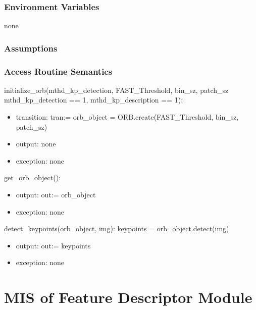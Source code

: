 \documentclass[12pt, titlepage]{article}
\begin{document}
\subsubsection{Environment Variables}
none

\subsubsection{Assumptions}


\subsubsection{Access Routine Semantics}

\noindent initialize\_orb(mthd\_kp\_detection, FAST\_Threshold, bin\_sz, patch\_sz 
\textbar \: mthd\_kp\_detection == 1, mthd\_kp\_description == 1):
\begin{itemize}
  \item transition: tran:= orb\_object = ORB.create(FAST\_Threshold, bin\_sz, patch\_sz) 
  \item output: none
  \item exception: none
\end{itemize}
\noindent get\_orb\_object():
\begin{itemize}
  \item output: out:= orb\_object
  \item exception: none
\end{itemize}
\noindent detect\_keypoints(orb\_object, img):\newline\newline
keypoints = orb\_object.detect(img)
\begin{itemize}
  \item output: out:= keypoints
  \item exception: none
\end{itemize}



\section{MIS of Feature Descriptor Module} \label{mFD}
\end{document}
